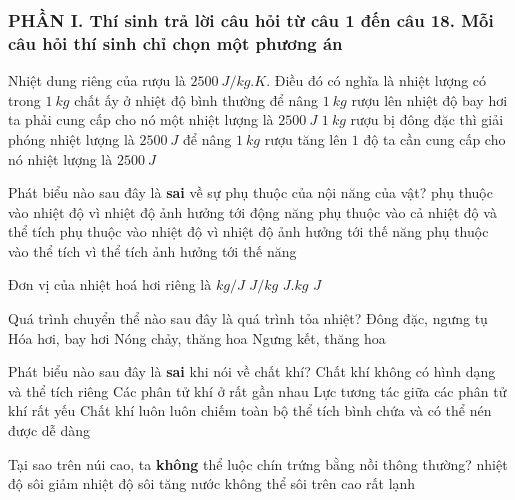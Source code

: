 \subsubsection*{PHẦN I. Thí sinh trả lời câu hỏi từ câu 1 đến câu 18. Mỗi câu hỏi thí sinh chỉ chọn một phương án}
\setcounter{ex}{0}
\begin{ex}
Nhiệt dung riêng của rượu là $2500\ J/kg.K$. Điều đó có nghĩa là
\choice
{nhiệt lượng có trong $1\ kg$ chất ấy ở nhiệt độ bình thường}
{để nâng $1\ kg$ rượu lên nhiệt độ bay hơi ta phải cung cấp cho nó một nhiệt lượng là $2500\ J$}
{$1\ kg$ rượu bị đông đặc thì giải phóng nhiệt lượng là $2500\ J$}
{\True để nâng $1\ kg$ rượu tăng lên $1$ độ ta cần cung cấp cho nó nhiệt lượng là $2500\ J$}
\loigiai{}
\end{ex}

\begin{ex}
Phát biểu nào sau đây là \textbf{sai} về sự phụ thuộc của nội năng của vật?
\choice
{phụ thuộc vào nhiệt độ vì nhiệt độ ảnh hưởng tới động năng}
{phụ thuộc vào cả nhiệt độ và thể tích}
{\True phụ thuộc vào nhiệt độ vì nhiệt độ ảnh hưởng tới thế năng}
{phụ thuộc vào thể tích vì thể tích ảnh hưởng tới thế năng}
\loigiai{}
\end{ex}

\begin{ex}
Đơn vị của nhiệt hoá hơi riêng là
\choice
{$kg/J$}
{\True $J/kg$}
{$J.kg$}
{$J$}
\loigiai{}
\end{ex}

\begin{ex}
Quá trình chuyển thể nào sau đây là quá trình tỏa nhiệt?
\choice
{\True Đông đặc, ngưng tụ}
{Hóa hơi, bay hơi}
{Nóng chảy, thăng hoa}
{Ngưng kết, thăng hoa}
\loigiai{}
\end{ex}

\begin{ex}
Phát biểu nào sau đây là \textbf{sai} khi nói về chất khí?
\choice
{Chất khí không có hình dạng và thể tích riêng}
{\True Các phân tử khí ở rất gần nhau}
{Lực tương tác giữa các phân tử khí rất yếu}
{Chất khí luôn luôn chiếm toàn bộ thể tích bình chứa và có thể nén được dễ dàng}
\loigiai{}
\end{ex}

\begin{ex}
Tại sao trên núi cao, ta \textbf{không} thể luộc chín trứng bằng nồi thông thường?
\choice
{\True nhiệt độ sôi giảm}
{nhiệt độ sôi tăng}
{nước không thể sôi}
{trên cao rất lạnh}
\loigiai{}
\end{ex}

